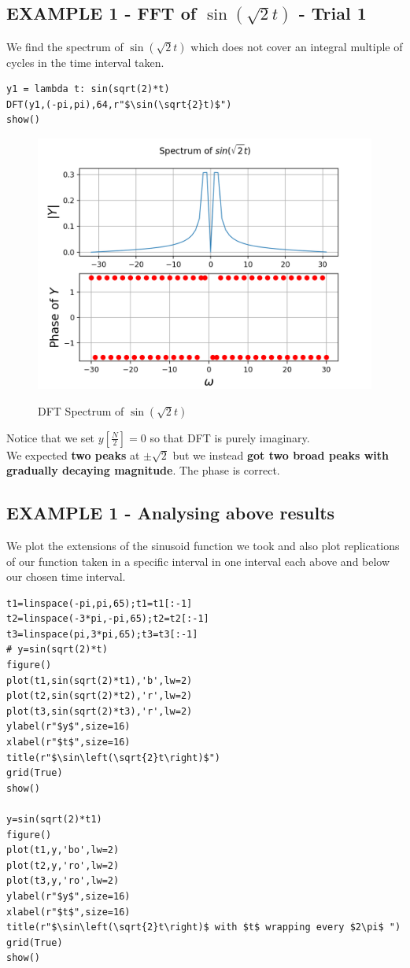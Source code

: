 \documentclass[11pt, a4paper]{article}
\begin{document}
\subsection{EXAMPLE 1 - FFT of $\sin(\sqrt{2} t)$ - Trial 1}
{
We find the spectrum of $\sin(\sqrt{2} t)$ which does not cover an integral multiple of cycles in the time interval taken.
}
\begin{verbatim}
y1 = lambda t: sin(sqrt(2)*t)
DFT(y1,(-pi,pi),64,r"$\sin(\sqrt{2}t)$")
show()
\end{verbatim}

\begin{figure}[H]
   	\centering
   	\includegraphics[scale=0.8]{ex_1_i.png}
   	\label{fig:ex_1_i}
   	\caption{DFT Spectrum of $\sin(\sqrt{2} t)$}
\end{figure}
{
Notice that we set $y[\frac{N}{2}] = 0$ so that DFT is purely imaginary.
\\We expected \textbf{two peaks} at $\pm \sqrt{2}$ but we instead \textbf{got two broad peaks with gradually decaying magnitude}. The phase is correct. 
}


\subsection{EXAMPLE 1 - Analysing above results}
{
We plot the extensions of the sinusoid function we took and also plot replications of our function taken in a specific interval in one interval each above and below our chosen time interval.
}
\begin{verbatim}
t1=linspace(-pi,pi,65);t1=t1[:-1]
t2=linspace(-3*pi,-pi,65);t2=t2[:-1]
t3=linspace(pi,3*pi,65);t3=t3[:-1]
# y=sin(sqrt(2)*t)
figure()
plot(t1,sin(sqrt(2)*t1),'b',lw=2)
plot(t2,sin(sqrt(2)*t2),'r',lw=2)
plot(t3,sin(sqrt(2)*t3),'r',lw=2)
ylabel(r"$y$",size=16)
xlabel(r"$t$",size=16)
title(r"$\sin\left(\sqrt{2}t\right)$")
grid(True)
show()

y=sin(sqrt(2)*t1)
figure()
plot(t1,y,'bo',lw=2)
plot(t2,y,'ro',lw=2)
plot(t3,y,'ro',lw=2)
ylabel(r"$y$",size=16)
xlabel(r"$t$",size=16)
title(r"$\sin\left(\sqrt{2}t\right)$ with $t$ wrapping every $2\pi$ ")
grid(True)
show()
\end{verbatim}
\end{document}
